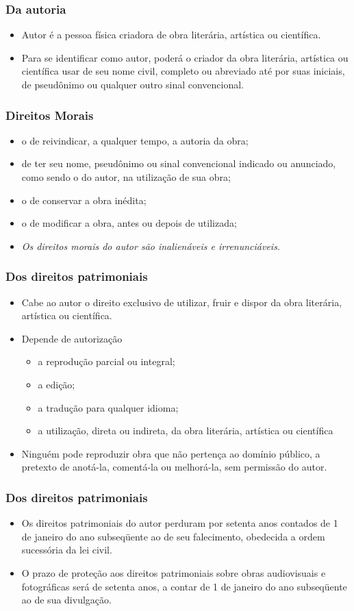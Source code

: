 \documentclass{beamer}
\begin{document}
\frame
{
	\frametitle{Da autoria}
	\begin{itemize}
		\item Autor é a pessoa física criadora de obra literária, artística ou científica.
		\item Para se identificar como autor, poderá o criador da obra literária, artística ou científica usar de seu nome civil, completo ou abreviado até por suas iniciais, de pseudônimo ou qualquer outro sinal convencional.
	\end{itemize}
}


\frame
{
	\frametitle{Direitos Morais}
	\begin{itemize}
		\item o de reivindicar, a qualquer tempo, a autoria da obra;
		\item de ter seu nome, pseudônimo ou sinal convencional indicado ou anunciado, como sendo o do autor, na utilização de sua obra;
		\item o de conservar a obra inédita; 
		\item o de modificar a obra, antes ou depois de utilizada;
		\item {\em Os direitos morais do autor são inalienáveis e irrenunciáveis.}
	\end{itemize}
}


\frame
{
	\frametitle{Dos direitos patrimoniais}
	\begin{itemize}
		\item Cabe ao autor o direito exclusivo de utilizar, fruir e dispor da obra literária, artística ou científica.
		\item Depende de autorização
		\begin{itemize}
			\item a reprodução parcial ou integral;
			\item a edição;
			\item a tradução para qualquer idioma;
			\item a utilização, direta ou indireta, da obra literária, artística ou científica
		\end{itemize}
		\item Ninguém pode reproduzir obra que não pertença ao domínio público, a pretexto de anotá-la, comentá-la ou melhorá-la, sem permissão do autor.
	\end{itemize}
}

\frame
{
	\frametitle{Dos direitos patrimoniais}
	\begin{itemize}
		\item Os direitos patrimoniais do autor perduram por setenta anos contados de 1 de janeiro do ano subseqüente ao de seu falecimento, obedecida a ordem sucessória da lei civil.
		\item O prazo de proteção aos direitos patrimoniais sobre obras audiovisuais e fotográficas será de setenta anos, a contar de 1 de janeiro do ano subseqüente ao de sua divulgação.
	\end{itemize}
}
\end{document}
